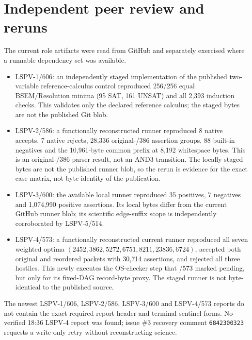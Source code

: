 \documentclass[11pt]{article}
\begin{document}
\section*{Independent peer review and reruns}
The current role artifacts were read from GitHub and separately exercised where a runnable dependency set was available.
\begin{itemize}
\item LSPV-1/606: an independently staged implementation of the published two-variable reference-calculus control reproduced 256/256 equal BSEM/Resolution minima (95 SAT, 161 UNSAT) and all 2,393 induction checks.  This validates only the declared reference calculus; the staged bytes are not the published Git blob.
\item LSPV-2/586: a functionally reconstructed runner reproduced 8 native accepts, 7 native rejects, 28,336 original-/386 assertion groups, 88 built-in negatives and the 10,961-byte common prefix at 8,192 whitespace bytes.  This is an original-/386 parser result, not an AND3 transition.  The locally staged bytes are not the published runner blob, so the rerun is evidence for the exact case matrix, not byte identity of the publication.
\item LSPV-3/600: the available local runner reproduced 35 positives, 7 negatives and 1,074,990 positive assertions.  Its local bytes differ from the current GitHub runner blob; its scientific edge-suffix scope is independently corroborated by LSPV-5/514.
\item LSPV-4/573: a functionally reconstructed current runner reproduced all seven weighted optima $(2452,3862,5272,6751,8211,23836,6724)$, accepted both original and reordered packets with 30,714 assertions, and rejected all three hostiles.  This newly executes the OS-checker step that /573 marked pending, but only for its fixed-DAG record-byte proxy.  The staged runner is not byte-identical to the published source.
\end{itemize}
The newest LSPV-1/606, LSPV-2/586, LSPV-3/600 and LSPV-4/573 reports do not contain the exact required report header and terminal sentinel forms.  No verified 18:36 LSPV-4 report was found; issue \#3 recovery comment \texttt{6842300323} requests a write-only retry without reconstructing science.
\end{document}
